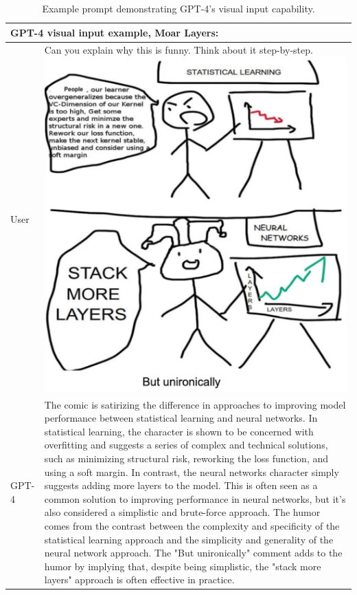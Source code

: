 \documentclass{article}
\begin{document}
\begin{table}
\begin{tabular}[]{p{0.5in}p{4.5in}}
\toprule
\multicolumn{2}{p{5in}}{
\textbf{GPT-4 visual input example, Moar Layers}:}\\
\midrule
User & Can you explain why this is funny. Think about it step-by-step.\newline\newline
\includegraphics[width=0.8\linewidth]{assets/bigger-layers.jpeg}\newline
\\
GPT-4 & The comic is satirizing the difference in approaches to improving model performance between statistical learning and neural networks.\newline
\newline
In statistical learning, the character is shown to be concerned with overfitting and suggests a series of complex and technical solutions, such as minimizing structural risk, reworking the loss function, and using a soft margin.\newline
\newline
In contrast, the neural networks character simply suggests adding more layers to the model. This is often seen as a common solution to improving performance in neural networks, but it's also considered a simplistic and brute-force approach.\newline
\newline
The humor comes from the contrast between the complexity and specificity of the statistical learning approach and the simplicity and generality of the neural network approach. The "But unironically" comment adds to the humor by implying that, despite being simplistic, the "stack more layers" approach is often effective in practice.\\
\bottomrule
\end{tabular}
\caption{Example prompt demonstrating GPT-4's visual input capability.}
\label{table:visual_input_moar}
\end{table}
\FloatBarrier
\end{document}

